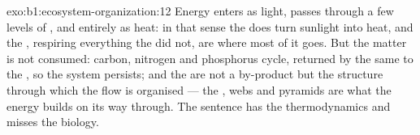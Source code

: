 \begin{solution}{exo:b1:ecosystem-organization:12}
Energy enters as light, passes through a few levels of ,
and  entirely as heat: in that sense the  does turn
sunlight into heat, and the , respiring everything the
 did not, are where most of it goes. But the matter is not
consumed: carbon, nitrogen and phosphorus cycle, returned by the same
 to the , so the system persists; and the
 are not a by-product but the structure through which the
flow is organised --- the , webs and pyramids are what the
energy builds on its way through. The sentence has the thermodynamics
and misses the biology.
\end{solution}

